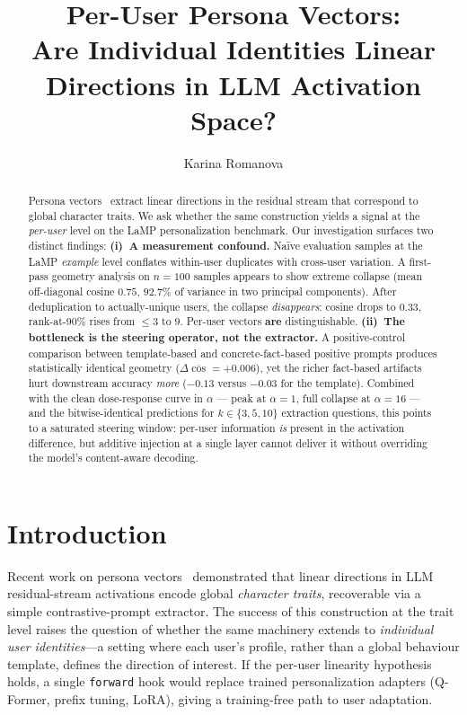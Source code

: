 \documentclass[10pt]{article}
\title{Per-User Persona Vectors:\\
Are Individual Identities Linear Directions in LLM Activation Space?}
\author{Karina Romanova}
\affil{}
\date{}
\begin{document}
\maketitle

\begin{abstract}
\noindent
Persona vectors~\cite{rimsky2025persona} extract linear directions in the
residual stream that correspond to global character traits.  We ask whether
the same construction yields a signal at the \emph{per-user} level on the
LaMP personalization benchmark.  Our investigation surfaces two distinct
findings:
\textbf{(i)~A measurement confound.}  Naïve evaluation samples at the LaMP
\emph{example} level conflates within-user duplicates with cross-user variation.
A first-pass geometry analysis on $n{=}100$ samples appears to show extreme
collapse (mean off-diagonal cosine $0.75$, $92.7\%$ of variance in two
principal components).  After deduplication to actually-unique users, the
collapse \emph{disappears}: cosine drops to $0.33$, rank-at-90\% rises from
$\le 3$ to $9$.  Per-user vectors \textbf{are} distinguishable.
\textbf{(ii)~The bottleneck is the steering operator, not the extractor.}
A positive-control comparison between template-based and concrete-fact-based
positive prompts produces statistically identical geometry ($\Delta\overline{\cos}
{=}+0.006$), yet the richer fact-based artifacts hurt downstream accuracy
\emph{more} ($-0.13$ versus $-0.03$ for the template).  Combined with the
clean dose-response curve in $\alpha$ — peak at $\alpha{=}1$, full collapse
at $\alpha{=}16$ — and the bitwise-identical predictions for
$k{\in}\{3,5,10\}$ extraction questions, this points to a saturated steering
window: per-user information \emph{is} present in the activation difference,
but additive injection at a single layer cannot deliver it without
overriding the model's content-aware decoding.
\end{abstract}

\section{Introduction}

Recent work on persona vectors~\cite{rimsky2025persona} demonstrated that
linear directions in LLM residual-stream activations encode global
\emph{character traits}, recoverable via a simple contrastive-prompt
extractor. The success of this construction at the trait level raises the
question of whether the same machinery extends to \emph{individual user
identities}—a setting where each user's profile, rather than a global
behaviour template, defines the direction of interest.  If the per-user
linearity hypothesis holds, a single \texttt{forward} hook would replace
trained personalization adapters (Q-Former, prefix tuning, LoRA), giving a
training-free path to user adaptation.
\end{document}
